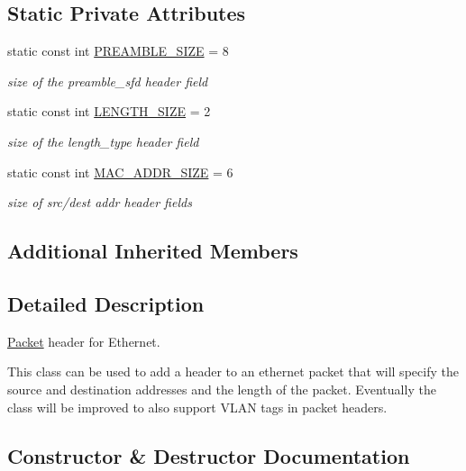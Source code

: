 \subsection*{Static Private Attributes}
\begin{DoxyCompactItemize}
\item 
static const int \hyperlink{classns3_1_1EthernetHeader_a51ace0e75a223cc4ce2a9313e1d4db56}{P\+R\+E\+A\+M\+B\+L\+E\+\_\+\+S\+I\+ZE} = 8
\begin{DoxyCompactList}\small\item\em size of the preamble\+\_\+sfd header field \end{DoxyCompactList}\item 
static const int \hyperlink{classns3_1_1EthernetHeader_ad8f3307209ad16991395e9e7a50da27a}{L\+E\+N\+G\+T\+H\+\_\+\+S\+I\+ZE} = 2
\begin{DoxyCompactList}\small\item\em size of the length\+\_\+type header field \end{DoxyCompactList}\item 
static const int \hyperlink{classns3_1_1EthernetHeader_a5752d153287d409a29b54f88c1f73cdc}{M\+A\+C\+\_\+\+A\+D\+D\+R\+\_\+\+S\+I\+ZE} = 6
\begin{DoxyCompactList}\small\item\em size of src/dest addr header fields \end{DoxyCompactList}\end{DoxyCompactItemize}
\subsection*{Additional Inherited Members}


\subsection{Detailed Description}
\hyperlink{classns3_1_1Packet}{Packet} header for Ethernet. 

This class can be used to add a header to an ethernet packet that will specify the source and destination addresses and the length of the packet. Eventually the class will be improved to also support V\+L\+AN tags in packet headers. 

\subsection{Constructor \& Destructor Documentation}
